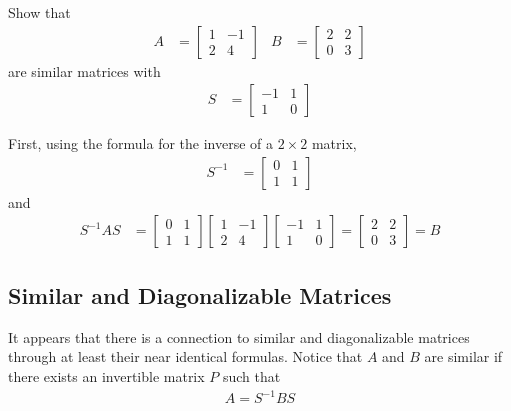 \begin{example} \label{ex:sim:matrices}
Show that 
%
\begin{align*}
A & = \begin{bmatrix}
1 & -1 \\ 2 & 4
\end{bmatrix} & B & = \begin{bmatrix}
2 & 2 \\ 0 & 3
\end{bmatrix}
\end{align*}
 are similar matrices with 
%
\begin{align*}
S & = \begin{bmatrix}
-1 & 1 \\ 1 & 0 
\end{bmatrix}
\end{align*}

\solution 

First, using the formula for the inverse of a $2 \times 2$ matrix, 
%
\begin{align*}
S^{-1} & =  \begin{bmatrix}
0 & 1 \\ 1 & 1 
\end{bmatrix}
\end{align*}
and 
%
\begin{align*}
S^{-1} A S & = \begin{bmatrix}
0 & 1 \\ 1 & 1
\end{bmatrix} \begin{bmatrix}
1 & -1 \\ 2 & 4 
\end{bmatrix}\begin{bmatrix}
-1 & 1 \\ 1 & 0  
\end{bmatrix} = \begin{bmatrix}
2& 2 \\ 0  & 3 
\end{bmatrix} = B 
\end{align*}

\end{example}

\phantom{hi}

\subsection{Similar and Diagonalizable Matrices}

It appears that there is a connection to similar and diagonalizable matrices through at least their near identical formulas.  Notice that $A$ and $B$ are similar if there exists an invertible matrix $P$ such that 
% 
\begin{align*}
A = S^{-1} B S
\end{align*}

